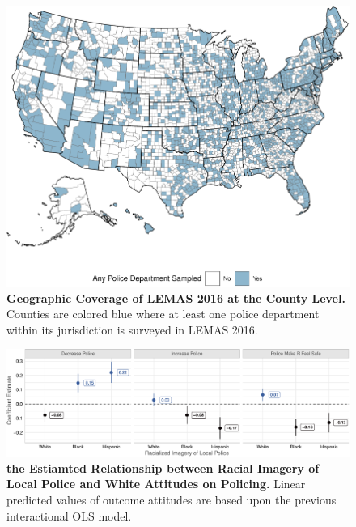 \documentclass[
  11pt,
]{article}
\begin{document}
\begin{figure}[t]

{\centering \includegraphics{paper_files/figure-pdf/fig-lemas-cover-1.pdf}

}

\caption{\label{fig-lemas-cover}\textbf{Geographic Coverage of LEMAS
2016 at the County Level.} Counties are colored blue where at least one
police department within its jurisdiction is surveyed in LEMAS 2016.}

\end{figure}

\begin{figure}[t]

{\centering \includegraphics{paper_files/figure-pdf/fig-baseline-1.pdf}

}

\caption{\label{fig-baseline}\textbf{the Estiamted Relationship between
Racial Imagery of Local Police and White Attitudes on Policing.} Linear
predicted values of outcome attitudes are based upon the previous
interactional OLS model.}

\end{figure}
\end{document}
